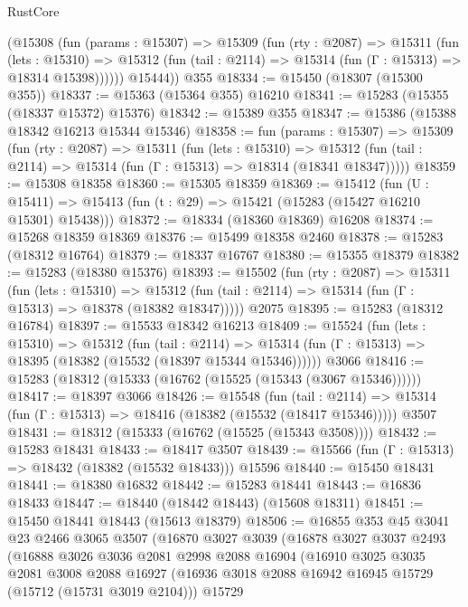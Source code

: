 \begin{lexlean}{RustCore}
\begin{coremodule}
        (@15308
          (fun (params : @15307) =>
          @15309
            (fun (rty : @2087) =>
            @15311
              (fun (lets : @15310) =>
              @15312 (fun (tail : @2114) => @15314 (fun (Γ : @15313) => @18314 @15398))))))
        @15444))
    @355
@18334 := @15450 (@18307 (@15300 @355))
@18337 := @15363 (@15364 @355) @16210
@18341 := @15283 (@15355 (@18337 @15372) @15376)
@18342 := @15389 @355
@18347 := @15386 (@15388 @18342 @16213 @15344 @15346)
@18358 := fun (params : @15307) =>
  @15309
    (fun (rty : @2087) =>
    @15311
      (fun (lets : @15310) =>
      @15312 (fun (tail : @2114) => @15314 (fun (Γ : @15313) => @18314 (@18341 @18347)))))
@18359 := @15308 @18358
@18360 := @15305 @18359
@18369 := @15412
    (fun (U : @15411) => @15413 (fun (t : @29) => @15421 (@15283 (@15427 @16210 @15301) @15438)))
@18372 := @18334 (@18360 @18369) @16208
@18374 := @15268 @18359 @18369
@18376 := @15499 @18358 @2460
@18378 := @15283 (@18312 @16764)
@18379 := @18337 @16767
@18380 := @15355 @18379
@18382 := @15283 (@18380 @15376)
@18393 := @15502
    (fun (rty : @2087) =>
    @15311
      (fun (lets : @15310) =>
      @15312 (fun (tail : @2114) => @15314 (fun (Γ : @15313) => @18378 (@18382 @18347)))))
    @2075
@18395 := @15283 (@18312 @16784)
@18397 := @15533 @18342 @16213
@18409 := @15524
    (fun (lets : @15310) =>
    @15312
      (fun (tail : @2114) =>
      @15314 (fun (Γ : @15313) => @18395 (@18382 (@15532 (@18397 @15344 @15346))))))
    @3066
@18416 := @15283 (@18312 (@15333 (@16762 (@15525 (@15343 (@3067 @15346))))))
@18417 := @18397 @3066
@18426 := @15548
    (fun (tail : @2114) => @15314 (fun (Γ : @15313) => @18416 (@18382 (@15532 (@18417 @15346)))))
    @3507
@18431 := @18312 (@15333 (@16762 (@15525 (@15343 @3508))))
@18432 := @15283 @18431
@18433 := @18417 @3507
@18439 := @15566 (fun (Γ : @15313) => @18432 (@18382 (@15532 @18433))) @15596
@18440 := @15450 @18431
@18441 := @18380 @16832
@18442 := @15283 @18441
@18443 := @16836 @18433
@18447 := @18440 (@18442 @18443) (@15608 @18311)
@18451 := @15450 @18441 @18443 (@15613 @18379)
@18506 := @16855
    @353
    @45
    @3041
    @23
    @2466
    @3065
    @3507
    (@16870
      @3027
      @3039
      (@16878
        @3027
        @3037
        @2493
        (@16888
          @3026
          @3036
          @2081
          @2998
          @2088
          @16904
          (@16910
            @3025
            @3035
            @2081
            @3008
            @2088
            @16927
            (@16936 @3018 @2088 @16942 @16945 @15729 (@15712 (@15731 @3019 @2104)))
            @15729

\end{coremodule}
\end{lexlean}
